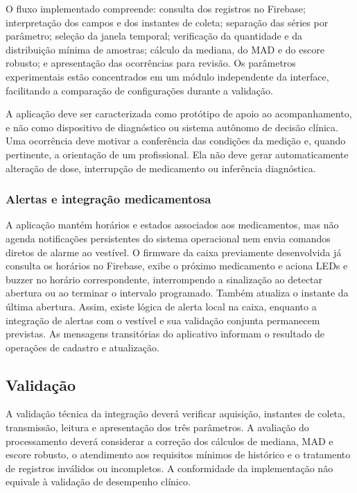 \documentclass[12pt]{article}
\begin{document}
O fluxo implementado compreende: consulta dos registros no Firebase; interpretação dos campos e dos instantes de coleta; separação das séries por parâmetro; seleção da janela temporal; verificação da quantidade e da distribuição mínima de amostras; cálculo da mediana, do MAD e do escore robusto; e apresentação das ocorrências para revisão. Os parâmetros experimentais estão concentrados em um módulo independente da interface, facilitando a comparação de configurações durante a validação.

A aplicação deve ser caracterizada como protótipo de apoio ao acompanhamento, e não como dispositivo de diagnóstico ou sistema autônomo de decisão clínica. Uma ocorrência deve motivar a conferência das condições da medição e, quando pertinente, a orientação de um profissional. Ela não deve gerar automaticamente alteração de dose, interrupção de medicamento ou inferência diagnóstica.

\subsubsection{Alertas e integração medicamentosa}

A aplicação mantém horários e estados associados aos medicamentos, mas não agenda notificações persistentes do sistema operacional nem envia comandos diretos de alarme ao vestível. O firmware da caixa previamente desenvolvida já consulta os horários no Firebase, exibe o próximo medicamento e aciona LEDs e buzzer no horário correspondente, interrompendo a sinalização ao detectar abertura ou ao terminar o intervalo programado. Também atualiza o instante da última abertura. Assim, existe lógica de alerta local na caixa, enquanto a integração de alertas com o vestível e sua validação conjunta permanecem previstas. As mensagens transitórias do aplicativo informam o resultado de operações de cadastro e atualização.

\subsection{Validação}

A validação técnica da integração deverá verificar aquisição, instantes de coleta, transmissão, leitura e apresentação dos três parâmetros. A avaliação do processamento deverá considerar a correção dos cálculos de mediana, MAD e escore robusto, o atendimento aos requisitos mínimos de histórico e o tratamento de registros inválidos ou incompletos. A conformidade da implementação não equivale à validação de desempenho clínico.
\end{document}
